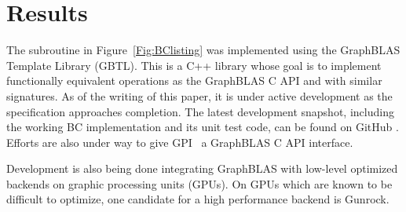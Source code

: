 \section{Results}
\label{sec:results}

The subroutine in Figure~\ref{Fig:BClisting} was implemented using
the GraphBLAS Template Library (GBTL)\cite{gbtl-cuda16}. This is
a C++ library whose goal is to implement functionally equivalent
operations as the GraphBLAS C API and with similar signatures.
As of the writing of this paper, it is under active development as the
specification approaches completion.  The latest development snapshot,
including the working BC implementation and its unit test code, can be
found on GitHub \cite{gbtl-github}. Efforts are also under way
to give GPI~\cite{gpi2016} a GraphBLAS C API interface.

Development is also being done integrating GraphBLAS with low-level
optimized backends on graphic processing units (GPUs). On GPUs which are
known to be difficult to optimize, one candidate for a high performance
backend is Gunrock\cite{topc17}.
